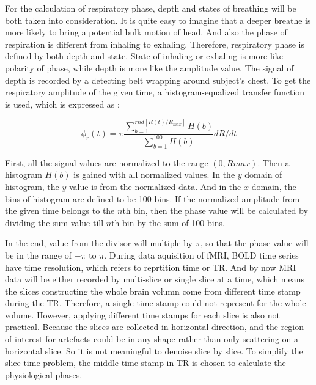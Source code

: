 For the calculation of respiratory phase, depth and states of breathing will be both taken into consideration. 
It is quite easy to imagine that a deeper breathe is more likely to bring a potential bulk motion of head. 
And also the phase of respiration is different from inhaling to exhaling. 
Therefore, respiratory phase is defined by both depth and state. 
State of inhaling or exhaling is more like polarity of phase, while depth is more like the amplitude value. 
The signal of depth is recorded by a detecting belt wrapping around subject's chest. 
To get the respiratory amplitude of the given time, a histogram-equalized transfer function is used, which is expressed  as :

\begin{equation}
    \phi_r(t) = \pi \frac{\sum_{b=1}^{rnd[R(t)/R_{max}]}H(b)}{\sum_{b=1}^{100}H(b)}dR/dt
\end{equation}

First, all the signal values are normalized to the range $(0, Rmax)$. Then a histogram $H(b)$ is gained with all normalized values. In the $y$ domain of histogram, the $y$ value is from the normalized data. 
And in the $x$ domain, the bins of histogram are defined to be 100 bins. 
If the normalized amplitude from the given time belongs to the $n$th bin, then the phase value will be calculated by dividing the sum value till $n$th bin by the sum of 100 bins.

In the end, value from the divisor will multiple by $\pi$, so that the phase value will be in the range of $-\pi$ to $\pi$.
During data aquisition of fMRI, BOLD time series have time resolution, which refers to reprtition time or TR. 
And by now MRI data will be either recorded by multi-slice or single slice at a time, which means the slices constructing the whole brain volumn come from different time stamp during the TR. 
Therefore, a single time stamp could not represent for the whole volume. 
However, applying different time stamps for each slice is also not practical. 
Because the slices are collected in horizontal direction, and the region of interest for artefacts could be in any shape rather than only scattering on a horizontal slice. 
So it is not meaningful to denoise slice by slice.
To simplify the slice time problem, the middle time stamp in TR is chosen to calculate the physiological phases.